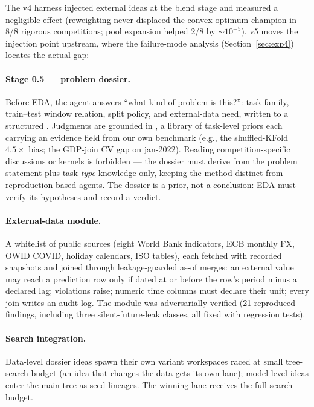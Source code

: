 \documentclass[11pt,a4paper]{article}
\begin{document}
The v4 harness injected external ideas at the blend stage and measured a negligible effect (reweighting never displaced the convex-optimum champion in 8/8 rigorous competitions; pool expansion helped 2/8 by ${\sim}10^{-5}$). v5 moves the injection point upstream, where the failure-mode analysis (Section~\ref{sec:exp4}) locates the actual gap:

\paragraph{Stage 0.5 --- problem dossier.} Before EDA, the agent answers ``what kind of problem is this?'': task family, train--test window relation, split policy, and external-data need, written to a structured . Judgments are grounded in , a library of task-level priors each carrying an evidence field from our own benchmark (e.g., the shuffled-KFold $4.5\times$ bias; the GDP-join CV gap on jan-2022). Reading competition-specific discussions or kernels is forbidden --- the dossier must derive from the problem statement plus task-\emph{type} knowledge only, keeping the method distinct from reproduction-based agents. The dossier is a prior, not a conclusion: EDA must verify its hypotheses and record a verdict.

\paragraph{External-data module.} A whitelist of public sources (eight World Bank indicators, ECB monthly FX, OWID COVID, holiday calendars, ISO tables), each fetched with recorded snapshots and joined through leakage-guarded as-of merges: an external value may reach a prediction row only if dated at or before the row's period minus a declared lag; violations raise; numeric time columns must declare their unit; every join writes an audit log. The module was adversarially verified (21 reproduced findings, including three silent-future-leak classes, all fixed with regression tests).

\paragraph{Search integration.} Data-level dossier ideas spawn their own variant workspaces raced at small tree-search budget (an idea that changes the data gets its own lane); model-level ideas enter the main tree as seed lineages. The winning lane receives the full search budget.
\end{document}
